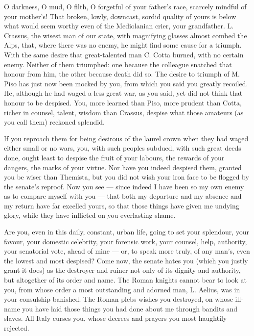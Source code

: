  O darkness, O mud, O filth, O forgetful of your father's race, scarcely mindful of your mother's! That broken, lowly, downcast, sordid quality of yours is below what would seem worthy even of the Mediolanian crier, your grandfather. L. Crassus, the wisest man of our state, with magnifying glasses almost combed the Alps, that, where there was no enemy, he might find some cause for a triumph. With the same desire that great-talented man C. Cotta burned, with no certain enemy. Neither of them triumphed: one because the colleague snatched that honour from him, the other because death did so. The desire to triumph of M. Piso has just now been mocked by you, from which you said you greatly recoiled. He, although he had waged a less great war, as you said, yet did not think that honour to be despised. You, more learned than Piso, more prudent than Cotta, richer in counsel, talent, wisdom than Crassus, despise what those amateurs (as you call them) reckoned splendid.

 If you reproach them for being desirous of the laurel crown when they had waged either small or no wars, you, with such peoples subdued, with such great deeds done, ought least to despise the fruit of your labours, the rewards of your dangers, the marks of your virtue. Nor have you indeed despised them, granted you be wiser than Themista, but you did not wish your iron face to be flogged by the senate's reproof. Now you see — since indeed I have been so my own enemy as to compare myself with you — that both my departure and my absence and my return have far excelled yours, so that those things have given me undying glory, while they have inflicted on you everlasting shame.

 Are you, even in this daily, constant, urban life, going to set your splendour, your favour, your domestic celebrity, your forensic work, your counsel, help, authority, your senatorial vote, ahead of mine — or, to speak more truly, of any man's, even the lowest and most despised? Come now, the senate hates you (which you justly grant it does) as the destroyer and ruiner not only of its dignity and authority, but altogether of its order and name. The Roman knights cannot bear to look at you, from whose order a most outstanding and adorned man, L. Aelius, was in your consulship banished. The Roman plebs wishes you destroyed, on whose ill-name you have laid those things you had done about me through bandits and slaves. All Italy curses you, whose decrees and prayers you most haughtily rejected.

